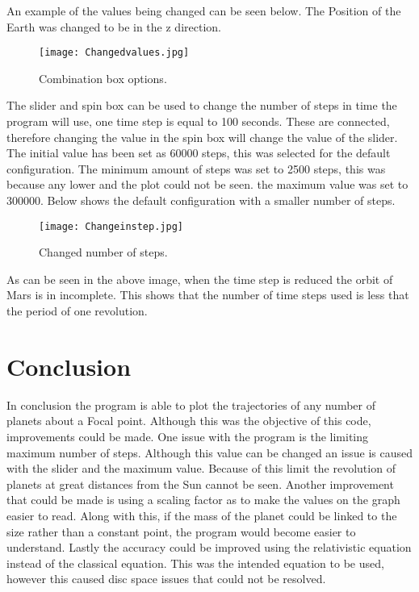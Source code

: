 \documentclass[11pt]{article}
\begin{document}
An example of the values being changed can be seen below. The Position of the Earth was changed to be in the z direction.

\begin{figure}[htbp] 										 
   \centering											
   \texttt{[image: Changedvalues.jpg]} 				
   \caption{Combination box options.}	
   \label{fig:coboop}								 
\end{figure}

The slider and spin box can be used to change the number of steps in time the program will use, one time step is equal to 100 seconds. These are connected, therefore changing the value in the spin box will change the value of the slider. The initial value has been set as 60000 steps, this was selected for the default configuration. The minimum amount of steps was set to 2500 steps, this was because any lower and the plot could not be seen. the maximum value was set to 300000. Below shows the default configuration with a smaller number of steps.

\begin{figure}[htbp] 										 
   \centering											
   \texttt{[image: Changeinstep.jpg]} 				
   \caption{Changed number of steps.}	
   \label{fig:chnuofst}								 
\end{figure}

As can be seen in the above image, when the time step is reduced the orbit of Mars is in incomplete. This shows that the number of time steps used is less that the period of one revolution.

\section{Conclusion \label{sec:Conclusion}}

In conclusion the program is able to plot the trajectories of any number of planets about a Focal point. Although this was the objective of this code, improvements could be made. One issue with the program is the limiting maximum number of steps. Although this value can be changed an issue is caused with the slider and the maximum value. Because of this limit the revolution of planets at great distances from the Sun cannot be seen.  Another improvement that could be made is using a scaling factor as to make the values on the graph easier to read. Along with this, if the mass of the planet could be linked to the size rather than a constant point, the program would become easier to understand. Lastly the accuracy could be improved using the relativistic equation instead of the classical equation. This was the intended equation to be used, however this caused disc space issues that could not be resolved.
\end{document}
